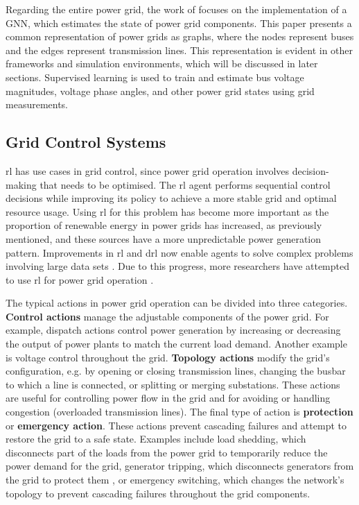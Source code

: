 Regarding the entire power grid, the work of \citet{ngo2024physics} focuses on the implementation of a GNN, which estimates the state of power grid components. This paper presents a common representation of power grids as graphs, where the nodes represent buses and the edges represent transmission lines. This representation is evident in other frameworks and simulation environments, which will be discussed in later sections. Supervised learning is used to train and estimate bus voltage magnitudes, voltage phase angles, and other power grid states using grid measurements.


\subsection{Grid Control Systems}\label{ssec:grid-ctrl-systems}
\ac{rl} has use cases in grid control, since power grid operation involves decision-making that needs to be optimised. The \ac{rl} agent performs sequential control decisions while improving its policy to achieve a more stable grid and optimal resource usage. 
Using \ac{rl} for this problem has become more important as the proportion of renewable energy in power grids has increased, as previously mentioned, and these sources have a more unpredictable power generation pattern. Improvements in \ac{rl} and \ac{drl} now enable agents to solve complex problems involving large data sets \cite{glavic2017reinforcement}. Due to this progress, more researchers have attempted to use \ac{rl} for power grid operation \cite{fan2022powergym}.

The typical actions in power grid operation can be divided into three categories. \textbf{Control actions} manage the adjustable components of the power grid. For example, dispatch actions control power generation by increasing or decreasing the output of power plants to match the current load demand. Another example is voltage control throughout the grid. \textbf{Topology actions} modify the grid's configuration, e.g. by opening or closing transmission lines, changing the busbar to which a line is connected, or splitting or merging substations. These actions are useful for controlling power flow in the grid and for avoiding or handling congestion (overloaded transmission lines). The final type of action is \textbf{protection} or \textbf{emergency action}. These actions prevent cascading failures and attempt to restore the grid to a safe state. Examples include load shedding, which disconnects part of the loads from the power grid to temporarily reduce the power demand for the grid, generator tripping, which disconnects generators from the grid to protect them \cite{protecting_synchronous_generators}, or emergency switching, which changes the network's topology to prevent cascading failures throughout the grid components.


